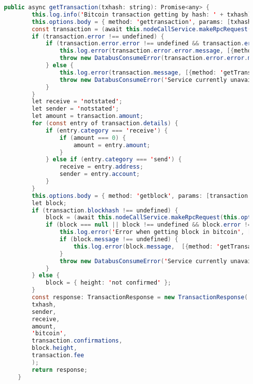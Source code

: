 \begin{lstlisting}[language=java]
	public async getTransaction(txhash: string): Promise<any> {
		this.log.info('Bitcoin transaction getting by hash: ' + txhash);
		this.options.body = { method: 'gettransaction', params: [txhash] };
		const transaction = (await this.nodeCallService.makeRpcRequest(this.options))[0];
		if (transaction.error !== undefined) {
			if (transaction.error.error !== undefined && transaction.error.error.message !== undefined) {
				this.log.error(transaction.error.error.message, [{method: 'getTransaction'}]);
				throw new DatabusConsumeError(transaction.error.error.message);
			} else {
				this.log.error(transaction.message, [{method: 'getTransaction'}]);
				throw new DatabusConsumeError('Service currently unavailable');
			}
		}
		let receive = 'notstated';
		let sender = 'notstated';
		let amount = transaction.amount;
		for (const entry of transaction.details) {
			if (entry.category === 'receive') {
				if (amount === 0) {
					amount = entry.amount;
				}
			} else if (entry.category === 'send') {
				receive = entry.address;
				sender = entry.account;
			}
		}
		this.options.body = { method: 'getblock', params: [transaction.blockhash] };
		let block;
		if (transaction.blockhash !== undefined) {
			block = (await this.nodeCallService.makeRpcRequest(this.options))[0];
			if (block === null || block !== undefined && block.error !== undefined) {
				this.log.error('Error when getting block in bitcoin', [{method: 'getTransaction'}]);
				if (block.message !== undefined) {
					this.log.error(block.message,  [{method: 'getTransaction'}]);
				}
				throw new DatabusConsumeError('Service currently unavailable');
			}
		} else {
			block = { height: 'not confirmed' };
		}
		const response: TransactionResponse = new TransactionResponse(
		txhash,
		sender,
		receive,
		amount,
		'bitcoin',
		transaction.confirmations,
		block.height,
		transaction.fee
		);
		return response;
	}
	

\end{lstlisting}
